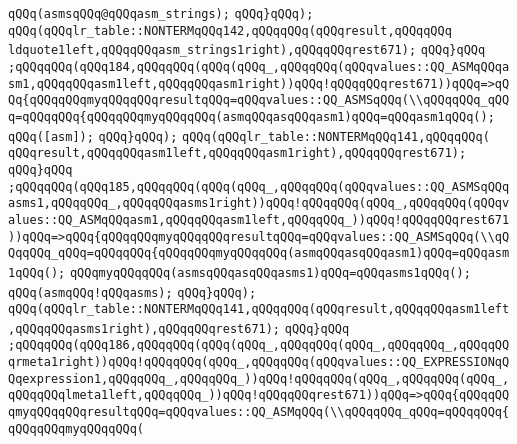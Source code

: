 \verb|qQQq(asmsqQQq@qQQqasm_strings);|\newline
\verb|qQQq}qQQq);|\newline
\verb|qQQq(qQQqlr_table::NONTERMqQQq142,qQQqqQQq(qQQqresult,qQQqqQQq|\newline
\verb|ldquote1left,qQQqqQQqasm_strings1right),qQQqqQQqrest671);|\newline
\verb|qQQq}qQQq|\newline
\verb|;qQQqqQQq(qQQq184,qQQqqQQq(qQQq(qQQq_,qQQqqQQq(qQQqvalues::QQ_ASMqQQqasm1,qQQqqQQqasm1left,qQQqqQQqasm1right))qQQq!qQQqqQQqrest671))qQQq=>qQQq{qQQqqQQqmyqQQqqQQqresultqQQq=qQQqvalues::QQ_ASMSqQQq(\\qQQqqQQq_qQQq=qQQqqQQq{qQQqqQQqmyqQQqqQQq(asmqQQqasqQQqasm1)qQQq=qQQqasm1qQQq();|\newline
\verb|qQQq([asm]);|\newline
\verb|qQQq}qQQq);|\newline
\verb|qQQq(qQQqlr_table::NONTERMqQQq141,qQQqqQQq(|\newline
\verb|qQQqresult,qQQqqQQqasm1left,qQQqqQQqasm1right),qQQqqQQqrest671);|\newline
\verb|qQQq}qQQq|\newline
\verb|;qQQqqQQq(qQQq185,qQQqqQQq(qQQq(qQQq_,qQQqqQQq(qQQqvalues::QQ_ASMSqQQqasms1,qQQqqQQq_,qQQqqQQqasms1right))qQQq!qQQqqQQq(qQQq_,qQQqqQQq(qQQqvalues::QQ_ASMqQQqasm1,qQQqqQQqasm1left,qQQqqQQq_))qQQq!qQQqqQQqrest671))qQQq=>qQQq{qQQqqQQqmyqQQqqQQqresultqQQq=qQQqvalues::QQ_ASMSqQQq(\\qQQqqQQq_qQQq=qQQqqQQq{qQQqqQQqmyqQQqqQQq(asmqQQqasqQQqasm1)qQQq=qQQqasm1qQQq();|\newline
\newline
\verb|qQQqmyqQQqqQQq(asmsqQQqasqQQqasms1)qQQq=qQQqasms1qQQq();|\newline
\verb|qQQq(asmqQQq!qQQqasms);|\newline
\verb|qQQq}qQQq);|\newline
\verb|qQQq(qQQqlr_table::NONTERMqQQq141,qQQqqQQq(qQQqresult,qQQqqQQqasm1left,qQQqqQQqasms1right),qQQqqQQqrest671);|\newline
\verb|qQQq}qQQq|\newline
\verb|;qQQqqQQq(qQQq186,qQQqqQQq(qQQq(qQQq_,qQQqqQQq(qQQq_,qQQqqQQq_,qQQqqQQqrmeta1right))qQQq!qQQqqQQq(qQQq_,qQQqqQQq(qQQqvalues::QQ_EXPRESSIONqQQqexpression1,qQQqqQQq_,qQQqqQQq_))qQQq!qQQqqQQq(qQQq_,qQQqqQQq(qQQq_,qQQqqQQqlmeta1left,qQQqqQQq_))qQQq!qQQqqQQqrest671))qQQq=>qQQq{qQQqqQQqmyqQQqqQQqresultqQQq=qQQqvalues::QQ_ASMqQQq(\\qQQqqQQq_qQQq=qQQqqQQq{qQQqqQQqmyqQQqqQQq(|\newline
